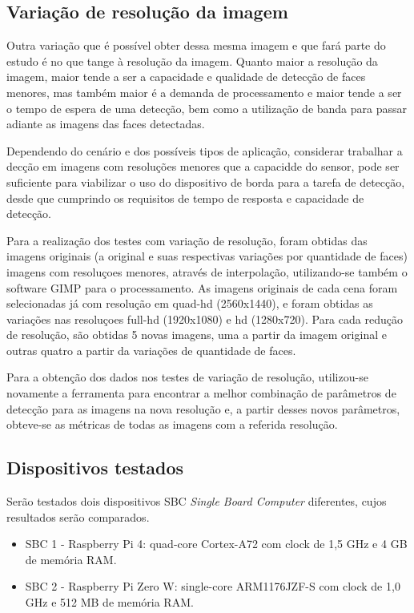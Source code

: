 \subsection{Variação de resolução da imagem}

Outra variação que é possível obter dessa mesma imagem e que fará parte do estudo é no que tange à resolução da imagem. Quanto maior a resolução da imagem, maior tende a ser a capacidade e qualidade de detecção de faces menores, mas também maior é a demanda de processamento e maior tende a ser o tempo de espera de uma detecção, bem como a utilização de banda para passar adiante as imagens das faces detectadas.

Dependendo do cenário e dos possíveis tipos de aplicação, considerar trabalhar a decção em imagens com resoluções menores que a capacidde do sensor, pode ser suficiente para viabilizar o uso do dispositivo de borda para a tarefa de detecção, desde que cumprindo os requisitos de tempo de resposta e capacidade de detecção.

Para a realização dos testes com variação de resolução, foram obtidas das imagens originais (a original e suas respectivas variações por quantidade de faces) imagens com resoluçoes menores, através de interpolação, utilizando-se também o software GIMP para o processamento. As imagens originais de cada cena foram selecionadas já com resolução em quad-hd (2560x1440), e foram obtidas as variações nas resoluçoes full-hd (1920x1080) e hd (1280x720). Para cada redução de resolução, são obtidas 5 novas imagens, uma a partir da imagem original e outras quatro a partir da variações de quantidade de faces.

Para a obtenção dos dados nos testes de variação de resolução, utilizou-se novamente a ferramenta para encontrar a melhor combinação de parâmetros de detecção para as imagens na nova resolução e, a partir desses novos parâmetros, obteve-se as métricas de todas as imagens com a referida resolução.

\subsection{Dispositivos testados}

Serão testados dois dispositivos SBC \textit{Single Board Computer} diferentes, cujos resultados serão comparados.

\begin{itemize}
    \item SBC 1 - Raspberry Pi 4: quad-core Cortex-A72 com clock de 1,5 GHz e 4 GB de memória RAM. 
    \item SBC 2 - Raspberry Pi Zero W: single-core ARM1176JZF-S com clock de 1,0 GHz e 512 MB de memória RAM.
\end{itemize}


